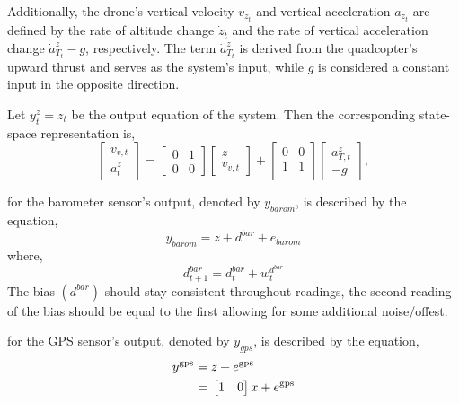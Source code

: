 \documentclass{article}
\begin{document}
Additionally, the drone's vertical velocity \( v_{z_t} \) and vertical acceleration \( a_{z_t} \) are defined by the rate of altitude change \( \dot{z}_t \) and the rate of vertical acceleration change \( \dot{a}^z_{T_t} - g \), respectively. The term \( \dot{a}^z_{T_t} \) is derived from the quadcopter's upward thrust and serves as the system's input, while \( g \) is considered a constant input in the opposite direction.

Let \( y_{t}^z = z_t \) be the output equation of the system. 
Then the corresponding state-space representation is,
\begin{equation}
    \begin{bmatrix}
    v_{v,t}\\
    a_{t}^z
    \end{bmatrix} =
    \begin{bmatrix}
    0 & 1 \\
    0 & 0 
    \end{bmatrix}
    \begin{bmatrix}
    z\\
    v_{v,t}
    \end{bmatrix} + 
    \begin{bmatrix}
    0 & 0 \\
    1 & 1 \\ 
    \end{bmatrix}
    \begin{bmatrix}
    a_{T,t}^z \\ 
    -g
    \end{bmatrix},
    \label{eq:4}
\end{equation}

\noindent
for the barometer sensor's output, denoted by \( y_{barom} \), is described by the equation,
\begin{equation}
y_{barom} = z + d^{bar} + e_{barom}
\end{equation}
where, 
\begin{equation}
    d^{bar}_{t+1} = d^{bar}_t + w_{t}^{d^{bar}}
\end{equation}
The bias $(d^{bar})$ should stay consistent throughout readings, 
the second reading of the bias should be equal to the first allowing for some additional noise/offest.

\noindent
for the GPS sensor's output, 
denoted by \( y_{gps} \), is described by the equation,
\begin{subequations}
    \begin{align}
        y^{\rm gps} 
        {}={}&
        z + e^{\rm gps} 
        \\
        {}={}&
        \begin{bmatrix}
            1 & 0
        \end{bmatrix}
        x + e^{\rm gps} 
    \end{align}
\end{subequations}
\end{document}
